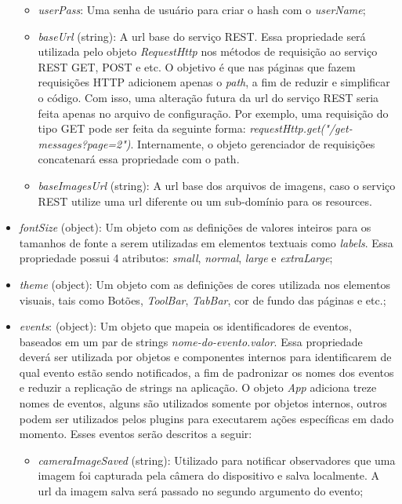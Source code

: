 \begin{itemize}
\begin{itemize}
		\item \textit{userPass}: Uma senha de usuário para criar o hash com o \textit{userName};

		\item \textit{baseUrl} (string): A url base do serviço REST. Essa propriedade será utilizada pelo objeto \textit{RequestHttp} nos métodos de requisição ao serviço REST GET, POST e etc. O objetivo é que nas páginas que fazem requisições HTTP adicionem apenas o \textit{path}, a fim de reduzir e simplificar o código. Com isso, uma alteração futura da url do serviço REST seria feita apenas no arquivo de configuração. Por exemplo, uma requisição do tipo GET pode ser feita da seguinte forma: \textit{requestHttp.get("/get-messages?page=2")}. Internamente, o objeto gerenciador de requisições concatenará essa propriedade com o path.

		\item \textit{baseImagesUrl} (string): A url base dos arquivos de imagens, caso o serviço REST utilize uma url diferente ou um sub-domínio para os resources.
	\end{itemize}

	\item \textit{fontSize} (object): Um objeto com as definições de valores inteiros para os tamanhos de fonte a serem utilizadas em elementos textuais como \textit{labels}. Essa propriedade possui 4 atributos: \textit{small}, \textit{normal}, \textit{large} e \textit{extraLarge};

	\item \textit{theme} (object): Um objeto com as definições de cores utilizada nos elementos visuais, tais como Botões, \textit{ToolBar}, \textit{TabBar}, cor de fundo das páginas e etc.;

	\item \textit{events}: (object): Um objeto que mapeia os identificadores de eventos, baseados em um par de strings \textit{nome-do-evento.valor}. Essa propriedade deverá ser utilizada por objetos e componentes internos para identificarem de qual evento estão sendo notificados, a fim de padronizar os nomes dos eventos e reduzir a replicação de strings na aplicação. O objeto \textit{App} adiciona treze nomes de eventos, alguns são utilizados somente por objetos internos, outros podem ser utilizados pelos plugins para executarem ações específicas em dado momento. Esses eventos serão descritos a seguir:

	\begin{itemize}
		\item \textit{cameraImageSaved} (string): Utilizado para notificar observadores que uma imagem foi capturada pela câmera do dispositivo e salva localmente. A url da imagem salva será passado no segundo argumento do evento;


\end{itemize}
\end{itemize}
